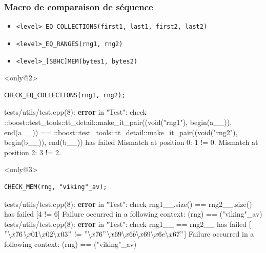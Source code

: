 \documentclass{beamer}
\begin{document}
\begin{frame}[fragile]
\frametitle{Macro de comparaison de séquence}
\begin{itemize}[<+->]
 \item \lstinline|<level>_EQ_COLLECTIONS(first1, last1, first2, last2)|
 \item \lstinline|<level>_EQ_RANGES(rng1, rng2)|
 \item \lstinline|<level>_[SBHC]MEM(bytes1, bytes2)|
\end{itemize}

\begin{exampleblock}{}<only@2>
\begin{lstlisting}
CHECK_EQ_COLLECTIONS(rng1, rng2);
\end{lstlisting}
{\color{f7}tests/utils/test.cpp(8)}: \textbf{\color{f1}error} in "{\color{f5}Test}":
 {\color{f4}check} {\color{f1}::boost::test\_tools::tt\_detail::make\_it\_pair((void("rng1"), begin(a\_\_)), end(a\_\_)) == ::boost::test\_tools::tt\_detail::make\_it\_pair((void("rng2"), begin(b\_\_)), end(b\_\_))} has failed \newline
Mismatch at position 0: 1 != 0.\newline
Mismatch at position 2: 3 != 2.
\end{exampleblock}

\begin{exampleblock}{}<only@3>
\begin{lstlisting}
CHECK_MEM(rng, "viking"_av);
\end{lstlisting}
{\color{f7}tests/utils/test.cpp(8)}: \textbf{\color{f1}error} in "{\color{f5}Test}":
 {\color{f4}check} {\color{f1}rng1\_\_.size()} {\color{f3}==} {\color{f1}rng2\_\_.size() has} failed [{\color{f6}4} {\color{f3}!=} {\color{f6}6}] \newline
Failure occurred in a following context: \newline
    (rng) == ("viking"\_av)\newline
{\color{f7}tests/utils/test.cpp(8)}: \textbf{\color{f1}error} in "{\color{f5}Test}":
 {\color{f4}check} {\color{f1}rng1\_\_} {\color{f3}==} {\color{f1}rng2\_\_ has} failed [{\color{f6}$"\backslash{}x76$}{\color{f1}$\backslash{}x01\backslash{}x02\backslash{}x03"$} {\color{f3}!=} {\color{f6}$"\backslash{}x76"$}{\color{f1}$\backslash{}x69\backslash{}x6b\backslash{}x69\backslash{}x6e\backslash{}x67"$}] \newline
Failure occurred in a following context: \newline
    (rng) == ("viking"\_av)
\end{exampleblock}


\end{frame}
\end{document}
